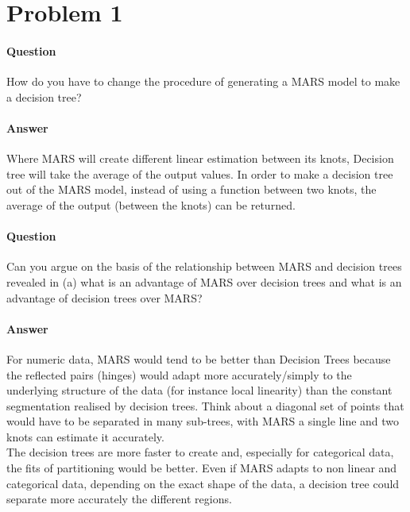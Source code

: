 \section*{Problem 1}

\paragraph{Question}How do you have to change the procedure of generating a MARS model to make a decision tree?

\paragraph{Answer} Where MARS will create different linear estimation between its knots, Decision tree will take the average of the output values. In order to make a decision tree out of the MARS model, instead of using a function between two knots, the average of the output (between the knots) can be returned. 

\paragraph{Question}Can you argue on the basis of the relationship between MARS and decision trees revealed in (a) what is an advantage of MARS over decision trees and what is an advantage of decision trees over MARS?
\\



\paragraph{Answer}For numeric data, MARS would tend to be better than Decision Trees because the reflected pairs (hinges) would adapt more accurately/simply to the underlying structure of the data (for instance local linearity) than the constant segmentation realised by decision trees. Think about a diagonal set of points that would have to be separated in many sub-trees, with MARS a single line and two knots can estimate it accurately. \\

\noindent The decision trees are more faster to create and, especially for categorical data, the fits of partitioning would be better. Even if MARS adapts to non linear and categorical data, depending on the exact shape of the data, a decision tree could separate more accurately the different regions.  





